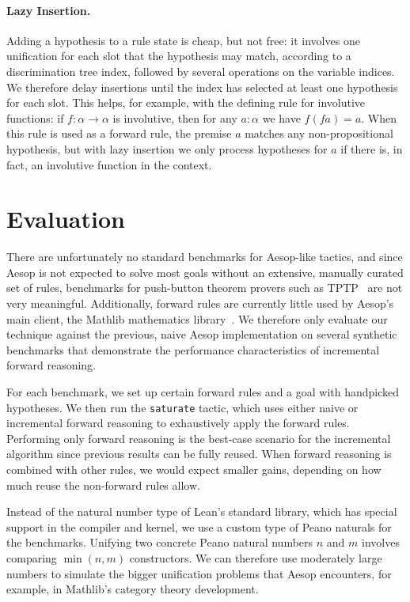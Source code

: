 \documentclass[runningheads]{llncs}
\begin{document}
\paragraph{Lazy Insertion.}
Adding a hypothesis to a rule state is cheap, but not free: it involves one unification for each slot that the hypothesis may match, according to a discrimination tree index, followed by several operations on the variable indices.
We therefore delay insertions until the index has selected at least one hypothesis for each slot.
This helps, for example, with the defining rule for involutive functions: if $f : α → α$ is involutive, then for any $a : α$ we have $f (f a) = a$.
When this rule is used as a forward rule, the premise $a$ matches any non-propositional hypothesis, but with lazy insertion we only process hypotheses for $a$ if there is, in fact, an involutive function in the context.

\section{Evaluation}%
\label{sec:evaluation}

There are unfortunately no standard benchmarks for Aesop-like tactics, and since Aesop is not expected to solve most goals without an extensive, manually curated set of rules, benchmarks for push-button theorem provers such as TPTP~\cite{TPTP} are not very meaningful.
Additionally, forward rules are currently little used by Aesop's main client, the Mathlib mathematics library~\cite{Mathlib}.
We therefore only evaluate our technique against the previous, naive Aesop implementation on several synthetic benchmarks that demonstrate the performance characteristics of incremental forward reasoning.

For each benchmark, we set up certain forward rules and a goal with handpicked hypotheses.
We then run the \texttt{saturate} tactic, which uses either naive or incremental forward reasoning to exhaustively apply the forward rules.
Performing only forward reasoning is the best-case scenario for the incremental algorithm since previous results can be fully reused.
When forward reasoning is combined with other rules, we would expect smaller gains, depending on how much reuse the non-forward rules allow.

Instead of the natural number type of Lean's standard library, which has special support in the compiler and kernel, we use a custom type of Peano naturals for the benchmarks.
Unifying two concrete Peano natural numbers $n$ and $m$ involves comparing $\min(n, m)$ constructors.
We can therefore use moderately large numbers to simulate the bigger unification problems that Aesop encounters, for example, in Mathlib's category theory development.
\end{document}
